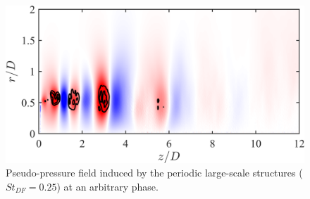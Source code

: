 \begin{figure}
	\centering
	\includegraphics[width=0.70\linewidth]{Figures/ch5_St025_PSL_41.png}
	\caption{Pseudo-pressure field induced by the periodic large-scale structures ($St_{DF} = 0.25$) at an arbitrary phase.}
	\label{fig:PSL_St025}
\end{figure}

